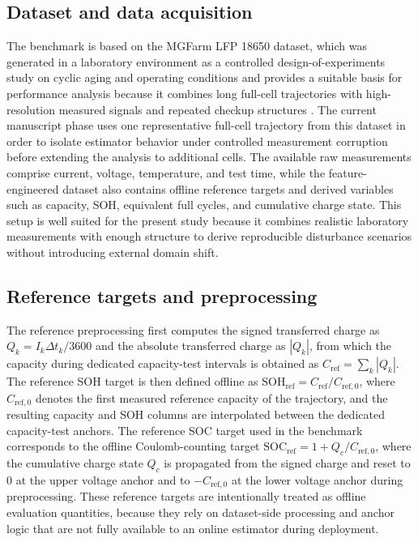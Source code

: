 \documentclass[review]{elsarticle}
\begin{document}
\subsection{Dataset and data acquisition}
The benchmark is based on the MGFarm LFP 18650 dataset, which was generated in a laboratory environment as a controlled design-of-experiments study on cyclic aging and operating conditions and provides a suitable basis for performance analysis because it combines long full-cell trajectories with high-resolution measured signals and repeated checkup structures \cite{aqachtoulMGFARMIoTEdgeDriven2026,LFP_DoE_Cycle_Aging_Dataset,siebertzStatistischeVersuchsplanung2017}. The current manuscript phase uses one representative full-cell trajectory from this dataset in order to isolate estimator behavior under controlled measurement corruption before extending the analysis to additional cells. The available raw measurements comprise current, voltage, temperature, and test time, while the feature-engineered dataset also contains offline reference targets and derived variables such as capacity, SOH, equivalent full cycles, and cumulative charge state. This setup is well suited for the present study because it combines realistic laboratory measurements with enough structure to derive reproducible disturbance scenarios without introducing external domain shift.

\subsection{Reference targets and preprocessing}
The reference preprocessing first computes the signed transferred charge as $Q_k = I_k \Delta t_k / 3600$ and the absolute transferred charge as $|Q_k|$, from which the capacity during dedicated capacity-test intervals is obtained as $C_{\mathrm{ref}} = \sum_k |Q_k|$. The reference SOH target is then defined offline as $\mathrm{SOH}_{\mathrm{ref}} = C_{\mathrm{ref}} / C_{\mathrm{ref},0}$, where $C_{\mathrm{ref},0}$ denotes the first measured reference capacity of the trajectory, and the resulting capacity and SOH columns are interpolated between the dedicated capacity-test anchors. The reference SOC target used in the benchmark corresponds to the offline Coulomb-counting target $\mathrm{SOC}_{\mathrm{ref}} = 1 + Q_c / C_{\mathrm{ref},0}$, where the cumulative charge state $Q_c$ is propagated from the signed charge and reset to $0$ at the upper voltage anchor and to $-C_{\mathrm{ref},0}$ at the lower voltage anchor during preprocessing. These reference targets are intentionally treated as offline evaluation quantities, because they rely on dataset-side processing and anchor logic that are not fully available to an online estimator during deployment.
\end{document}
